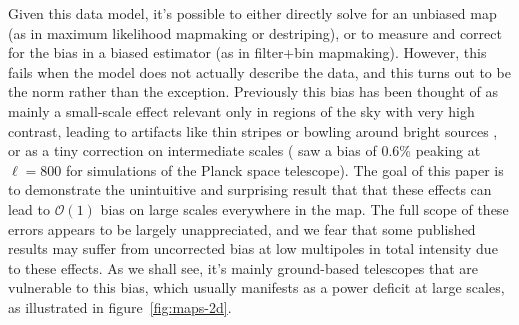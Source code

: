\documentclass[twocolumn,apj]{aastex63}
\begin{document}
Given this data model, it's possible to either directly solve for
an unbiased map (as in maximum likelihood mapmaking or destriping),
or to measure and correct for the bias in a biased estimator
(as in filter+bin mapmaking). However, this fails when the model
does not actually describe the data, and this turns out to be
the norm rather than the exception. Previously this bias has
been thought of as mainly a small-scale effect relevant only in
regions of the sky with very high contrast, leading to artifacts
like thin stripes or bowling around bright sources \citep{xgls-2017,model-error},
or as a tiny correction on intermediate scales (\citet{planck-ml-bias-2006}
saw a bias of 0.6\% peaking at $\ell=800$ for simulations of the Planck
space telescope). The goal of this paper is to
demonstrate the unintuitive and surprising result that that these effects
can lead to $\mathcal{O}(1)$ bias on large scales everywhere
in the map. The full scope of these errors appears to be largely
unappreciated, and we fear that some published results
may suffer from uncorrected bias at low multipoles in total intensity
due to these effects. As we shall see, it's mainly ground-based telescopes
that are vulnerable to this bias, which usually manifests as a power
deficit at large scales, as illustrated in figure~\ref{fig:maps-2d}.
\end{document}
